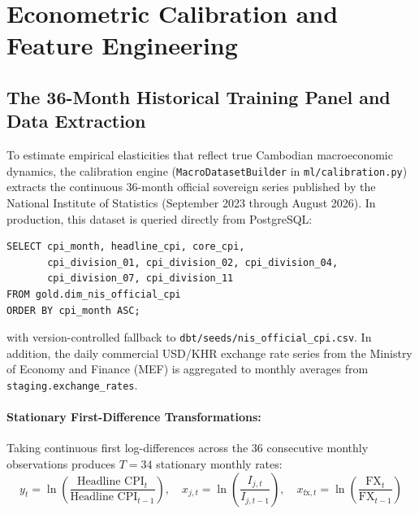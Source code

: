 \documentclass[a4paper, 11pt]{article}
\begin{document}
\section{Econometric Calibration and Feature Engineering}

\subsection{The 36-Month Historical Training Panel and Data Extraction}
To estimate empirical elasticities that reflect true Cambodian macroeconomic dynamics, the calibration engine (\texttt{MacroDatasetBuilder} in \texttt{ml/calibration.py}) extracts the continuous 36-month official sovereign series published by the National Institute of Statistics (September 2023 through August 2026). In production, this dataset is queried directly from PostgreSQL:
\begin{verbatim}
SELECT cpi_month, headline_cpi, core_cpi,
       cpi_division_01, cpi_division_02, cpi_division_04,
       cpi_division_07, cpi_division_11
FROM gold.dim_nis_official_cpi
ORDER BY cpi_month ASC;
\end{verbatim}
with version-controlled fallback to \texttt{dbt/seeds/nis\_official\_cpi.csv}. In addition, the daily commercial USD/KHR exchange rate series from the Ministry of Economy and Finance (MEF) is aggregated to monthly averages from \texttt{staging.exchange\_rates}.

\paragraph{Stationary First-Difference Transformations:}
Taking continuous first log-differences across the 36 consecutive monthly observations produces $T = 34$ stationary monthly rates:
\begin{equation}
    y_t = \ln\left(\frac{\text{Headline CPI}_t}{\text{Headline CPI}_{t-1}}\right), \quad x_{j, t} = \ln\left(\frac{I_{j, t}}{I_{j, t-1}}\right), \quad x_{\text{fx}, t} = \ln\left(\frac{\text{FX}_t}{\text{FX}_{t-1}}\right)
\end{equation}
\end{document}
